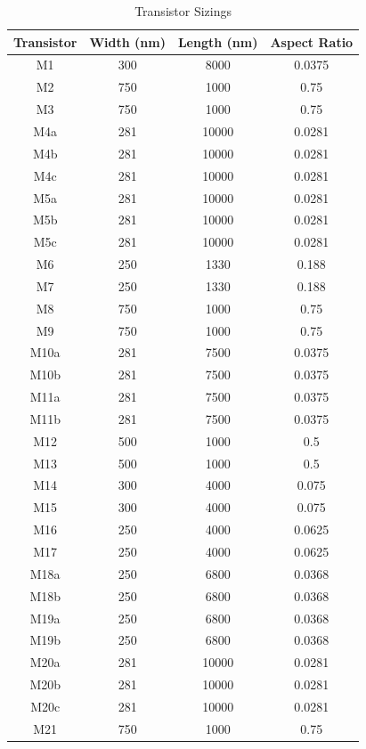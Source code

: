 \documentclass[journal]{IEEEtran}
\begin{document}
\begin{table}
\centering
\caption{Transistor Sizings}
\label{tab:trans_sizes}
\begin{tabular}{|c|c|c|c|}
\hline Transistor & Width (nm) & Length (nm) & Aspect Ratio \\ 
\hline M1 & 300 & 8000 & 0.0375 \\ 
\hline M2 & 750 & 1000 & 0.75 \\ 
\hline M3 & 750 & 1000 & 0.75 \\ 
\hline M4a & 281 & 10000 & 0.0281 \\ 
\hline M4b & 281 & 10000 & 0.0281 \\ 
\hline M4c & 281 & 10000 & 0.0281 \\ 
\hline M5a & 281 & 10000 & 0.0281 \\ 
\hline M5b & 281 & 10000 & 0.0281 \\
\hline M5c & 281 & 10000 & 0.0281  \\
\hline M6 & 250 & 1330 & 0.188 \\
\hline M7 & 250 & 1330 & 0.188 \\
\hline M8 & 750 & 1000 & 0.75 \\
\hline M9 & 750 & 1000 & 0.75 \\
\hline M10a & 281 & 7500 & 0.0375 \\
\hline M10b & 281 & 7500 & 0.0375 \\
\hline M11a & 281 & 7500 & 0.0375  \\
\hline M11b & 281 & 7500 & 0.0375 \\
\hline M12 & 500 & 1000 & 0.5 \\
\hline M13 & 500 & 1000 & 0.5  \\
\hline M14 & 300 & 4000 & 0.075 \\
\hline M15 & 300 & 4000 & 0.075  \\
\hline M16 & 250 & 4000 & 0.0625 \\
\hline M17 & 250 & 4000 & 0.0625  \\
\hline M18a & 250 & 6800 & 0.0368 \\
\hline M18b & 250 & 6800 & 0.0368  \\
\hline M19a & 250 & 6800 & 0.0368 \\
\hline M19b & 250 & 6800 & 0.0368 \\
\hline M20a & 281 & 10000 & 0.0281 \\
\hline M20b & 281 & 10000 & 0.0281  \\
\hline M20c & 281 & 10000 & 0.0281  \\
\hline M21 & 750 & 1000 & 0.75 \\

\end{tabular}
\end{table}
\end{document}
